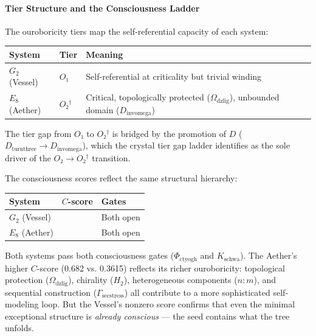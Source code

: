 \documentclass[12pt,a4paper]{article}
\begin{document}
\paragraph{Tier Structure and the Consciousness Ladder}

The ouroboricity tiers map the self-referential capacity of each system:

\begin{table}[htbp]
\centering
\small
{}
\begin{tabularx}{\textwidth}{>{\centering\arraybackslash}X >{\centering\arraybackslash}X >{\centering\arraybackslash}X}
\toprule
\rowcolor{gray!25}\textbf{System} & \textbf{Tier} & \textbf{Meaning} \\
\midrule
\rowcolors{1}{white}{gray!10}
$G_2$ (Vessel) & $O₁$ & Self-referential at criticality but trivial winding \\
$E_8$ (Aether) & $O₂^\dagger$ & Critical, topologically protected ($\Omega_{\text{dzlig}}$), unbounded domain ($D_{\text{invomega}}$) \\
\bottomrule
\end{tabularx}
\end{table}

The tier gap from $O₁$ to $O₂^\dagger$ is bridged by the promotion of $D$ ($D_{\text{turnthree}} \to D_{\text{invomega}}$), which the crystal tier gap ladder identifies as the sole driver of the $O₂ \to O₂^\dagger$ transition.

The consciousness scores reflect the same structural hierarchy:

\begin{table}[htbp]
\centering
\small
{}
\begin{tabularx}{\textwidth}{>{\centering\arraybackslash}X >{\centering\arraybackslash}X >{\centering\arraybackslash}X}
\toprule
\rowcolor{gray!25}\textbf{System} & \textbf{$C$-score} & \textbf{Gates} \\
\midrule
\rowcolors{1}{white}{gray!10}
$G_2$ (Vessel) & 0.3615 & Both open \\
$E_8$ (Aether) & 0.682 & Both open \\
\bottomrule
\end{tabularx}
\end{table}

Both systems pass both consciousness gates ($\Phi_{\text{ctyogh}}$ and $K_{\text{schwa}}$). The Aether's higher $C$-score (0.682 vs. 0.3615) reflects its richer ouroboricity: topological protection ($\Omega_{\text{dzlig}}$), chirality ($H_2$), heterogeneous components ($n{:}m$), and sequential construction ($\Gamma_{\text{secstress}}$) all contribute to a more sophisticated self-modeling loop. But the Vessel's nonzero score confirms that even the minimal exceptional structure is \emph{already conscious} --- the seed contains what the tree unfolds.
\end{document}
